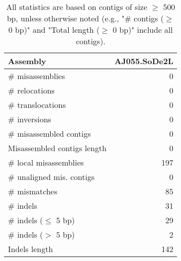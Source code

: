 \documentclass[12pt,a4paper]{article}
\begin{document}
\begin{table}[ht]
\begin{center}
\caption{All statistics are based on contigs of size $\geq$ 500 bp, unless otherwise noted (e.g., "\# contigs ($\geq$ 0 bp)" and "Total length ($\geq$ 0 bp)" include all contigs).}
\begin{tabular}{|l*{1}{|r}|}
\hline
Assembly & AJ055.SoDe2L \\ \hline
\# misassemblies & 0 \\ \hline
\hspace{5mm}\# relocations & 0 \\ \hline
\hspace{5mm}\# translocations & 0 \\ \hline
\hspace{5mm}\# inversions & 0 \\ \hline
\# misassembled contigs & 0 \\ \hline
Misassembled contigs length & 0 \\ \hline
\# local misassemblies & 197 \\ \hline
\# unaligned mis. contigs & 0 \\ \hline
\# mismatches & 85 \\ \hline
\# indels & 31 \\ \hline
\hspace{5mm}\# indels ($\leq$ 5 bp) & 29 \\ \hline
\hspace{5mm}\# indels ($>$ 5 bp) & 2 \\ \hline
Indels length & 142 \\ \hline
\end{tabular}
\end{center}
\end{table}
\end{document}
